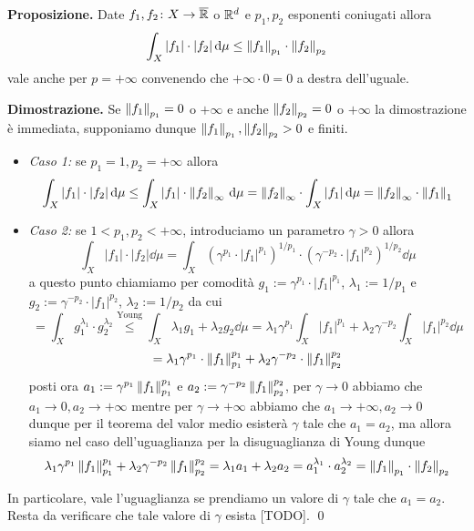 \documentclass[a4paper, 12pt]{report}
\begin{document}
\textbf{Proposizione.}
Date $f_1, f_2 \colon X \to \overline{\mathbb R}$ o $\mathbb R^d$ e $p_1, p_2$ esponenti coniugati allora
$$
\int_X |f_1| \cdot |f_2| \,\mathrm{d} \mu \leq \left\lVert f_1 \right\rVert_{p_1} \cdot \left\lVert f_2 \right\rVert_{p_2}
$$ 
vale anche per $p = +\infty$ convenendo che $+\infty \cdot 0 = 0$ a destra dell'uguale.

\textbf{Dimostrazione.}
Se $\left\lVert f_1 \right\rVert_{p_1} = 0$ o $+\infty$ e anche $\left\lVert f_2 \right\rVert_{p_2} = 0$ o $+\infty$ la dimostrazione è immediata, supponiamo dunque $\left\lVert f_1 \right\rVert_{p_1}, \left\lVert f_2 \right\rVert_{p_2} > 0$ e finiti.

\begin{itemize}
	\item \textit{Caso 1:} se $p_1 = 1, p_2 = +\infty$ allora
		$$
		\int_X |f_1| \cdot |f_2| \,\mathrm{d} \mu 
		\leq \int_X |f_1| \cdot \left\lVert f_2 \right\rVert_{\infty} \,\mathrm{d} \mu
		= \left\lVert f_2 \right\rVert_{\infty} \cdot \int_X |f_1| \,\mathrm{d} \mu
		= \left\lVert f_2 \right\rVert_{\infty} \cdot \left\lVert f_1 \right\rVert_{1} 
		$$

	\item \textit{Caso 2:} se $1 < p_1, p_2 < +\infty$, introduciamo un parametro $\gamma > 0$ allora
		$$
		\int_X |f_1| \cdot |f_2| \dd \mu 
		= \int_X \left( \gamma^{p_1} \cdot |f_1|^{p_1} \right)^{1/p_1} \cdot \left( \gamma^{-p_2} \cdot |f_1|^{p_2} \right)^{1/p_2} \dd \mu
		$$
		a questo punto chiamiamo per comodità $g_1 := \gamma^{p_1} \cdot |f_1|^{p_1}$, $\lambda_1 := 1 / p_1$ e $g_2 := \gamma^{-p_2} \cdot |f_1|^{p_2}$, $\lambda_2 := 1 / p_2$ da cui
		$$
		= \int_X g_1^{\lambda_1} \cdot g_2^{\lambda_2} 
		\overset{\text{Young}}{\leq} \int_X \lambda_1 g_1 + \lambda_2 g_2 \dd \mu
		= \lambda_1 \gamma^{p_1} \int_X |f_1|^{p_1} + \lambda_2 \gamma^{-p_2} \int_X |f_1|^{p_2} \dd \mu
		$$
		$$
		= \lambda_1 \gamma^{p_1} \cdot \left\lVert f_1 \right\rVert_{p_1}^{p_1} + \lambda_2 \gamma^{-p_2} \cdot \left\lVert f_1 \right\rVert_{p_2}^{p_2}
		$$
		posti ora $a_1 := \gamma^{p_1} \left\lVert f_1 \right\rVert_{p_1}^{p_1}$ e $a_2 := \gamma^{-p_2} \left\lVert f_1 \right\rVert_{p_2}^{p_2}$, per $\gamma \to 0$ abbiamo che $a_1 \to 0, a_2 \to +\infty$ mentre per $\gamma \to +\infty$ abbiamo che $a_1 \to +\infty, a_2 \to 0$ dunque per il teorema del valor medio esisterà $\gamma$ tale che $a_1 = a_2$, ma allora siamo nel caso dell'uguaglianza per la disuguaglianza di Young dunque
		$$
		\lambda_1 \gamma^{p_1} \left\lVert f_1 \right\rVert_{p_1}^{p_1} + \lambda_2 \gamma^{-p_2} \left\lVert f_1 \right\rVert_{p_2}^{p_2} 
		= \lambda_1 a_1 + \lambda_2 a_2 = a_1^{\lambda_1} \cdot a_2^{\lambda_2} 
		= \left\lVert f_1 \right\rVert_{p_1} \cdot \left\lVert f_2 \right\rVert_{p_2}
		$$
\end{itemize}
In particolare, vale l'uguaglianza se prendiamo un valore di $\gamma$ tale che $a_1 = a_2$. Resta da verificare che tale valore di $\gamma$ esista [TODO].
\qed
\end{document}
